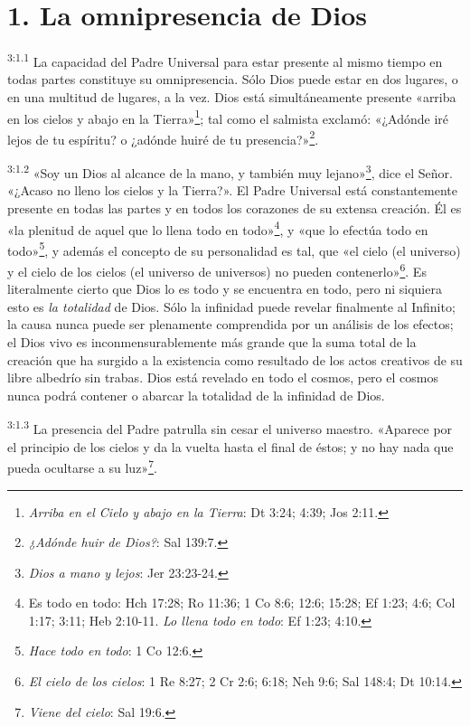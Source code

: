 \section*{1. La omnipresencia de Dios}
\par
\textsuperscript{3:1.1} La capacidad del Padre Universal para estar presente al mismo tiempo en todas partes constituye su omnipresencia. Sólo Dios puede estar en dos lugares, o en una multitud de lugares, a la vez. Dios está simultáneamente presente «arriba en los cielos y abajo en la Tierra»\footnote{\textit{Arriba en el Cielo y abajo en la Tierra}: Dt 3:24; 4:39; Jos 2:11.}; tal como el salmista exclamó: «¿Adónde iré lejos de tu espíritu? o ¿adónde huiré de tu presencia?»\footnote{\textit{¿Adónde huir de Dios?}: Sal 139:7.}.

\par
\textsuperscript{3:1.2} «Soy un Dios al alcance de la mano, y también muy lejano»\footnote{\textit{Dios a mano y lejos}: Jer 23:23-24.}, dice el Señor. «¿Acaso no lleno los cielos y la Tierra?». El Padre Universal está constantemente presente en todas las partes y en todos los corazones de su extensa creación. Él es «la plenitud de aquel que lo llena todo en todo»\footnote{Es todo en todo: Hch 17:28; Ro 11:36; 1 Co 8:6; 12:6; 15:28; Ef 1:23; 4:6; Col 1:17; 3:11; Heb 2:10-11. \textit{Lo llena todo en todo}: Ef 1:23; 4:10.}, y «que lo efectúa todo en todo»\footnote{\textit{Hace todo en todo}: 1 Co 12:6.}, y además el concepto de su personalidad es tal, que «el cielo (el universo) y el cielo de los cielos (el universo de universos) no pueden contenerlo»\footnote{\textit{El cielo de los cielos}: 1 Re 8:27; 2 Cr 2:6; 6:18; Neh 9:6; Sal 148:4; Dt 10:14.}. Es literalmente cierto que Dios lo es todo y se encuentra en todo, pero ni siquiera esto es \textit{la totalidad} de Dios. Sólo la infinidad puede revelar finalmente al Infinito; la causa nunca puede ser plenamente comprendida por un análisis de los efectos; el Dios vivo es inconmensurablemente más grande que la suma total de la creación que ha surgido a la existencia como resultado de los actos creativos de su libre albedrío sin trabas. Dios está revelado en todo el cosmos, pero el cosmos nunca podrá contener o abarcar la totalidad de la infinidad de Dios.

\par
\textsuperscript{3:1.3} La presencia del Padre patrulla sin cesar el universo maestro. «Aparece por el principio de los cielos y da la vuelta hasta el final de éstos; y no hay nada que pueda ocultarse a su luz»\footnote{\textit{Viene del cielo}: Sal 19:6.}.

